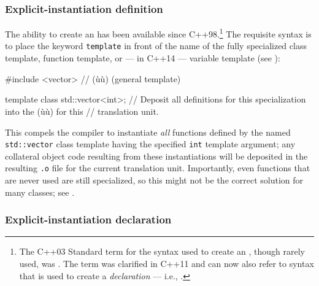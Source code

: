 \subsubsection[Explicit-instantiation definition]{Explicit-instantiation definition}\label{explicit-instantiation-definition}

The ability to create an  has been available since C++98.{\cprotect\footnote{The
  C++03 Standard term for the syntax used to create an
  , though rarely used,
  was . The term
   was clarified in
  C++11 and can now also refer to syntax that is used to create a
  \emph{declaration} --- i.e., .}} The requisite syntax is to place the keyword
\lstinline!template! in front of the name of the fully specialized class
template, function template, or --- in C++14 --- variable
template (see ):

\begin{emcppslisting}
#include <vector>  // (ù{}ù) (general template)

template class std::vector<int>;
    // Deposit all definitions for this specialization into the (ù{}ù) for this
    // translation unit.
\end{emcppslisting}

\noindent This  compels the compiler to
instantiate \emph{all} functions defined by the named
\lstinline!std::vector! class template having the specified \lstinline!int!
template argument; any collateral object code resulting from these
instantiations will be deposited in the resulting \lstinline!.o! file for
the current translation unit. Importantly, even functions that are never
used are still specialized, so this might not be the correct solution
for many classes; see .

\subsubsection[Explicit-instantiation declaration]{Explicit-instantiation declaration}\label{explicit-instantiation-declaration}

